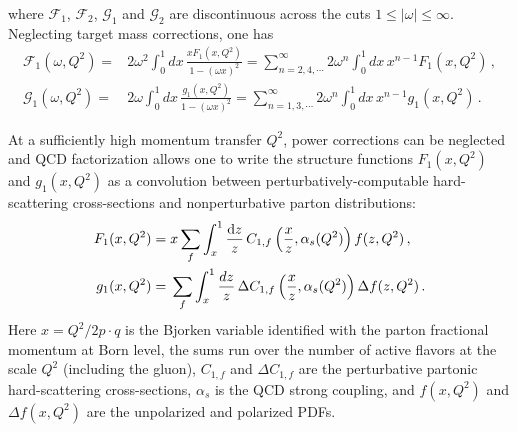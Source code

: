 where $\mathcal{F}_1$, $\mathcal{F}_2$, $\mathcal{G}_1$ and $\mathcal{G}_2$
are discontinuous across the cuts $1\leq |\omega| \leq \infty$.
%
Neglecting target mass corrections, one has
\begin{align}
\mathcal{F}_1(\omega,Q^2) 
= {} & 2 \omega^2 \int_0^1 dx\,  \frac{xF_1(x,Q^2)}{1-(\omega x)^2} 
= \sum_{n=2,4,\cdots}^\infty 2\omega^n \int_0^1 dx\, x^{n-1} F_1(x,Q^2) \,, \\
\mathcal{G}_1(\omega,Q^2) 
= {} & 2 \omega \int_0^1 dx\, \frac{g_1(x,Q^2)}{1-(\omega x)^2} 
= \sum_{n=1,3,\cdots}^\infty 2\omega^n \int_0^1 dx\, x^{n-1} g_1(x,Q^2)\,.
\end{align}

At a sufficiently high momentum transfer $Q^2$, power corrections can be 
neglected and QCD factorization allows one to write the structure functions 
$F_1(x,Q^2)$ and $g_1(x,Q^2)$ as a convolution between perturbatively-computable
hard-scattering cross-sections and nonperturbative parton distributions:
\begin{align}
F_1(x,Q^2) 
= {} 
& x\sum_f \int_x^1 \frac{{\rm d}z}{z}\,C_{1,f}\left(\frac{x}{z},\alpha_s(Q^2)\right)f(z,Q^2) \,, \label{eq:Fi}\\
g_1(x,Q^2) 
= {} 
& \sum_f \int_x^1\frac{dz}{z}\, \Delta C_{1,f}\left(\frac{x}{z},\alpha_s(Q^2)\right) \Delta f(z,Q^2) \,.
\label{pdf}
\end{align}
%
Here $x=Q^2/2p\cdot q$ is the Bjorken variable identified with the parton
fractional momentum at Born level, the sums run over the number of active
flavors at the scale $Q^2$ (including the gluon), $C_{1,f}$ and 
$\Delta C_{1,f}$ are the perturbative partonic hard-scattering cross-sections,
$\alpha_s$ is the QCD strong coupling, and $f(x,Q^2)$ and $\Delta f(x,Q^2)$ 
are the unpolarized and polarized PDFs.

